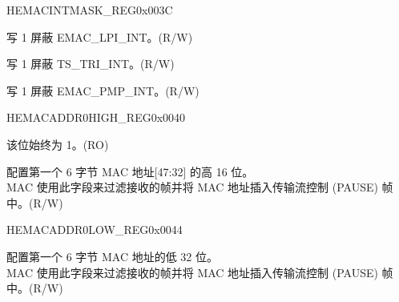 \begin{register}{H}{EMACINTMASK\_REG}{0x003C}\label{regdesc:EMACINTMASKREG}
%
%
%
%
%
%
\regnewline%
\begin{regdesc}\begin{reglist}
\item [LPIINTMASK] 写 1 屏蔽 EMAC\_LPI\_INT。(R/W)
\item [TSINTMASK] 写 1 屏蔽 TS\_TRI\_INT。(R/W)
\item [PMTINTMASK] 写 1 屏蔽 EMAC\_PMP\_INT。(R/W)
\end{reglist}\end{regdesc}
\end{register}


\begin{register}{H}{EMACADDR0HIGH\_REG}{0x0040}\label{regdesc:EMACADDR0HIGHREG}
%
%
%
\regnewline%
\begin{regdesc}\begin{reglist}
\item [ADDRESS\_ENABLE0] 该位始终为 1。(RO)
\item [MAC\_ADDRESS0\_HI] 配置第一个 6 字节 MAC 地址[47:32] 的高 16 位。\\MAC 使用此字段来过滤接收的帧并将 MAC 地址插入传输流控制 (PAUSE) 帧中。(R/W)
\end{reglist}\end{regdesc}
\end{register}


\begin{register}{H}{EMACADDR0LOW\_REG}{0x0044}\label{regdesc:EMACADDR0LOWREG}
%
\regnewline%
\begin{regdesc}\begin{reglist}
\item [EMACADDR0LOW\_REG] 配置第一个 6 字节 MAC 地址的低 32 位。\\MAC 使用此字段来过滤接收的帧并将 MAC 地址插入传输流控制 (PAUSE) 帧中。(R/W)
\end{reglist}\end{regdesc}
\end{register}


